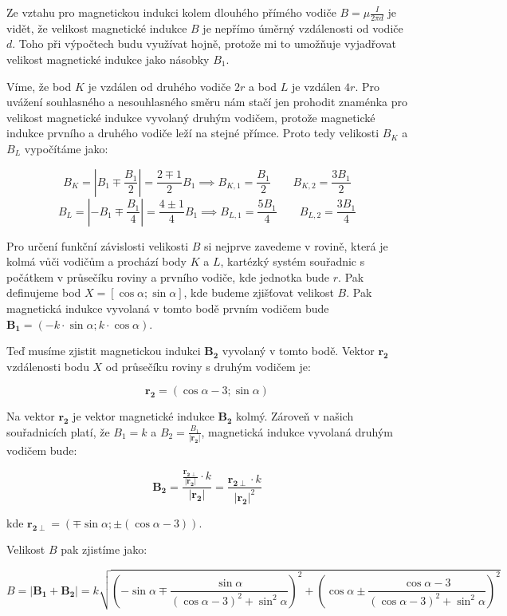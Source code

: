 \documentclass{fkssolpub}
\author{Ondřej Sedláček}
\begin{document}
 

Ze vztahu pro magnetickou indukci kolem dlouhého přímého vodiče
$B = \mu \frac{I}{2 \pi d}$ je vidět, že velikost magnetické indukce $B$ 
je nepřímo úměrný vzdálenosti od vodiče $d$. Toho při výpočtech budu
využívat hojně, protože mi to umožňuje vyjadřovat velikost magnetické
indukce jako násobky $B_1$.

Víme, že bod $K$ je vzdálen od druhého vodiče $2r$ a bod $L$ je vzdálen
$4r$. Pro uvážení souhlasného a nesouhlasného směru nám stačí jen prohodit
znaménka pro velikost magnetické indukce vyvolaný druhým vodičem, protože
magnetické indukce prvního a druhého vodiče leží na stejné přímce. Proto
tedy velikosti $B_K$ a $B_L$ vypočítáme jako:

\[
  B_K = |B_1 \mp \frac{B_1}{2}| = \frac{2 \mp 1}{2} B_1 
    \implies B_{K, 1} = \frac{B_1}{2} \qquad B_{K, 2} = \frac{3 B_1}{2} 
\]
\[
  B_L = |-B_1 \mp \frac{B_1}{4}| = \frac{4 \pm 1}{4} B_1
    \implies B_{L, 1} = \frac{5 B_1}{4} \qquad B_{L, 2} = \frac{3 B_1}{4} 
\]

Pro určení funkční závislosti velikosti $B$ si nejprve zavedeme v rovině,
která je kolmá vůči vodičům a prochází body $K$ a $L$, kartézký 
systém souřadnic s počátkem v průsečíku roviny a prvního vodiče, kde jednotka
bude $r$. Pak
definujeme bod $X = [\cos \alpha; \sin \alpha]$, kde budeme zjišťovat 
velikost $B$. Pak magnetická indukce vyvolaná v tomto bodě prvním vodičem
bude $\mathbf{B_1} = (-k \cdot \sin \alpha; k \cdot \cos \alpha)$.

Teď musíme zjistit magnetickou indukci $\mathbf{B_2}$ vyvolaný v tomto
bodě. Vektor $\mathbf{r_2}$ vzdálenosti bodu $X$ od průsečíku roviny s druhým 
vodičem je:

\[
  \mathbf{r_2} = (\cos \alpha - 3; \sin \alpha)
\]

Na vektor $\mathbf{r_2}$ je vektor magnetické indukce $\mathbf{B_2}$ kolmý.
Zároveň v našich souřadnicích platí, že $B_1 = k$ a 
$B_2 = \frac{B_1}{|\mathbf{r_2}|}$, magnetická indukce vyvolaná druhým
vodičem bude:

\[
  \mathbf{B_2} = \frac{\frac{\mathbf{r_{2 \perp}}}{|\mathbf{r_2}|} \cdot k}{|\mathbf{r_2}|}
    = \frac{\mathbf{r_{2 \perp}} \cdot k}{|\mathbf{r_2}|^2}
\]

kde $\mathbf{r_{2 \perp}} = (\mp \sin \alpha; \pm (\cos \alpha - 3))$.

Velikost $B$ pak zjistíme jako:

\[
  B = |\mathbf{B_1} + \mathbf{B_2}| 
    = k \sqrt{\left(- \sin \alpha \mp \frac{ \sin \alpha}{(\cos \alpha - 3)^2 + \sin^2 \alpha} \right)^2
      + \left( \cos \alpha \pm \frac{\cos \alpha - 3}{(\cos \alpha - 3)^2 + \sin^2 \alpha} \right)^2}
\]
\end{document}
